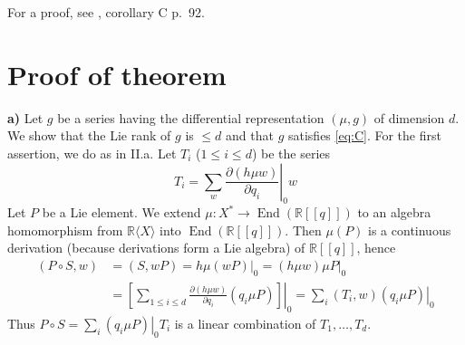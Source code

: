 \documentclass[a4paper,12pt]{article}
\newcommand{\End}{\operatorname{End}}
\newcommand{\R}{\mathbb{R}}
\newcommand{\Rx}{\R\langle X\rangle}
\begin{document}
For a proof, see \cite{8}, corollary C p.\ 92.

\section{Proof of theorem}

\textbf{a)} Let $g$ be a series having the differential representation $(\mu,g)$ of dimension $d$. We show that the Lie rank of $g$ is $\leq d$ and that $g$ satisfies \eqref{eq:C}. For the first assertion, we do as in \cite{5} II.a. Let $T_i$ ($1 \leq i \leq d$) be the series
\begin{equation*}
	{T}_{{i}}=\left.\sum_{{w}} \frac{\partial({h} \mu {w})}{\partial {q}_{{i}}}\right|_{0} {w}
\end{equation*}
Let ${P}$ be a Lie element. We extend $\mu: X^* \to \End(\R[[q]])$ to an algebra homomorphism from $\Rx$ into $\End(\R[[q]])$. Then $\mu(P)$ is a continuous derivation (because derivations form a Lie algebra) of $\R[[q]]$, hence
\begin{equation*}
	\begin{split}
		(P \circ S, w)&=(S, w P)=\left.h \mu(w P)\right|_0=\left.(h \mu w) \mu P\right|_0 \\
		& =\left.\left[\sum_{1 \leq i \leq d} \frac{\partial(h \mu w)}{\partial q_i}\left(q_i \mu P\right)\right]\right|_0=\left.\sum_i\left(T_i, w\right)\left(q_i \mu P\right)\right|_0
	\end{split}
\end{equation*}
Thus ${P} \circ {S}=\left.\sum_i\left({q}_i \mu {P}\right)\right|_{0} {T}_i$ is a linear combination of ${T}_1, \ldots, {T}_{{d}}$.
\end{document}
